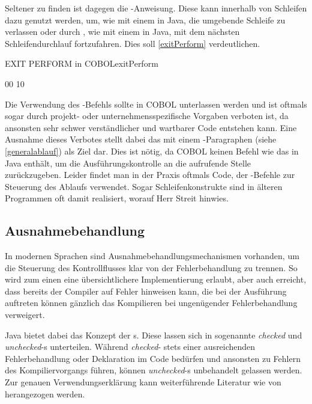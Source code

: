 Seltener zu finden ist dagegen die -Anweisung. Diese kann innerhalb von Schleifen dazu genutzt werden, um, wie mit einem  in Java, die umgebende Schleife zu verlassen oder durch , wie mit einem  in Java, mit dem nächsten Schleifendurchlauf fortzufahren. Dies soll \autoref{exitPerform} verdeutlichen.

\begin{codeWithCaption}{EXIT PERFORM in COBOL}{exitPerform}
\begin{shellwindow}
00
10
\end{shellwindow}
\end{codeWithCaption}

Die Verwendung des -Befehls sollte in COBOL unterlassen werden und ist oftmals sogar durch projekt- oder unternehmensspezifische Vorgaben verboten ist, da ansonsten sehr schwer verständlicher und wartbarer Code entstehen kann. Eine Ausnahme dieses Verbotes stellt dabei das  mit einem -Paragraphen (siehe \autoref{generalablauf}) als Ziel dar. Dies ist nötig, da COBOL keinen Befehl wie das  in Java enthält, um die Ausführungskontrolle an die aufrufende Stelle zurückzugeben. Leider findet man in der Praxis oftmals Code, der -Befehle zur Steuerung des Ablaufs verwendet. Sogar Schleifenkonstrukte sind in älteren Programmen oft damit realisiert, worauf Herr Streit hinwies. 

\subsection{Ausnahmebehandlung} \label{exceptions}

In modernen Sprachen sind Ausnahmebehandlungsmechanismen vorhanden, um die Steuerung des Kontrollflusses klar von der Fehlerbehandlung zu trennen. So wird zum einen eine übersichtlichere Implementierung erlaubt, aber auch erreicht, dass bereits der Compiler auf Fehler hinweisen kann, die bei der Ausführung auftreten können \bzw gänzlich das Kompilieren bei ungenügender Fehlerbehandlung verweigert.

Java bietet dabei das Konzept der s. Diese lassen sich in sogenannte \textit{checked} und \textit{unchecked}-s unterteilen. Während \textit{checked}- stets einer ausreichenden Fehlerbehandlung oder Deklaration im Code bedürfen und ansonsten zu Fehlern des Kompiliervorgangs führen, können \textit{unchecked}-s unbehandelt gelassen werden. Zur genauen Verwendungserklärung kann weiterführende Literatur wie  von \citeauthor{byrne_java_2009-1} herangezogen werden.

